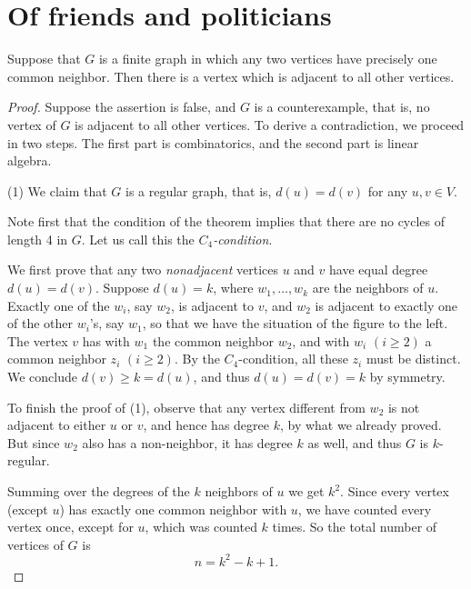 \chapter{Of friends and politicians}

\begin{theorem}
  \label{friendship}
  Suppose that $G$ is a finite graph in which any two vertices have precisely one common neighbor.
  Then there is a vertex which is adjacent to all other vertices.
\end{theorem}
\begin{proof}
  Suppose the assertion is false, and $G$ is a counterexample, that is, no vertex of $G$ is
  adjacent to all other vertices. To derive a contradiction,
   we proceed in two steps. The first part is combinatorics, and the second part is linear algebra.

(1) We claim that $G$ is a regular graph, that is, $d(u) = d(v)$ for any $u, v \in V$.

Note first that the condition of the theorem implies that there are no cycles of length
4 in $G$. Let us call this the \emph{$C_4$-condition}.

We first prove that any two \emph{nonadjacent} vertices $u$ and $v$ have equal degree $d(u) = d(v)$.
Suppose $d(u) = k$, where $w_1, \dots, w_k$ are the neighbors of $u$. Exactly one of the
 $w_i$, say $w_2$, is adjacent to $v$, and $w_2$ is adjacent to exactly one of the other $w_i$'s,
 say $w_1$, so that we have the situation of the figure to the left. The vertex $v$ has with $w_1$
 the common neighbor $w_2$, and with $w_i$ $(i \geq 2)$ a common neighbor $z_i$ $(i \geq 2)$.
 By the $C_4$-condition, all these $z_i$ must be distinct. We conclude $d(v) \geq k = d(u)$, and
 thus $d(u) = d(v) = k$ by symmetry.

To finish the proof of (1), observe that any vertex different from $w_2$ is not adjacent to either
 $u$ or $v$, and hence has degree $k$, by what we already proved. But since $w_2$ also has a
 non-neighbor, it has degree $k$ as well, and thus $G$ is $k$-regular.

Summing over the degrees of the $k$ neighbors of $u$ we get $k^2$. Since every vertex (except $u$)
has exactly one common neighbor with $u$, we have counted every vertex once, except for $u$,
which was counted $k$ times. So the total number of vertices of $G$ is
\[
n = k^2 - k + 1.
\]


\end{proof}
